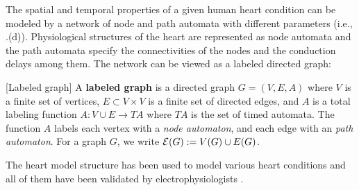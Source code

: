 %
The spatial and temporal properties of a given human heart condition can be modeled by a network of node and path automata with different parameters (i.e., .(d)). Physiological structures of the heart are represented as node automata and the path automata specify the connectivities of the nodes and the conduction delays among them. 
The network can be viewed as a labeled directed graph: %
\begin{defn}
	\label{def:labeledGraph}
	[Labeled graph]
	A \textbf{labeled graph} is a directed graph $G = (V,E,A)$ where 
	$V$ is a finite set of vertices, $E \subset V\times V$ is a finite set of directed edges,
	and $A$ is a total labeling function $A: V \cup E \rightarrow TA$
	where $TA$ is the set of timed automata.
	The function $A$ labels each vertex with a \emph{node automaton}, and each edge with an \emph{path automaton}.
	For a graph $G$, we write $\mathcal{E}(G) := V(G) \cup E(G)$.
\end{defn}
The heart model structure has been used to model various heart conditions and all of them have been validated by electrophysiologists \cite{vhm_ecrts10,vhm_embc10}.

